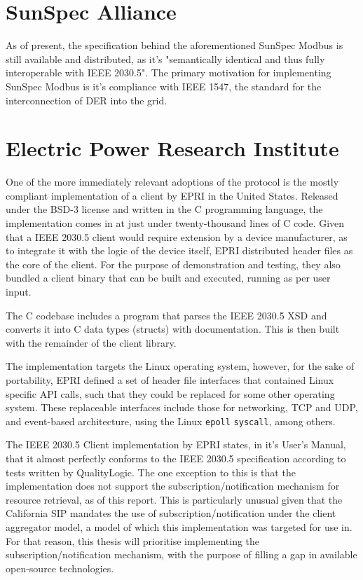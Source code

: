 \section{SunSpec Alliance}

As of present, the specification behind the aforementioned SunSpec Modbus is still available and distributed, as it's "semantically identical and thus fully interoperable with IEEE 2030.5". 
The primary motivation for implementing SunSpec Modbus is it's compliance with IEEE 1547, the standard for the interconnection of DER into the grid. \cite[]{SunSpecModbus}


\section{Electric Power Research Institute}
One of the more immediately relevant adoptions of the protocol is the mostly compliant implementation of a client by EPRI in the United States.
Released under the BSD-3 license and written in the C programming language, the implementation comes in at just under twenty-thousand lines of C code.
Given that a IEEE 2030.5 client would require extension by a device manufacturer, as to integrate it with the logic of the device itself, EPRI distributed header files as the core of the client.
For the purpose of demonstration and testing, they also bundled a client binary that can be built and executed, running as per user input.

The C codebase includes a program that parses the IEEE 2030.5 XSD and converts it into C data types (structs) with documentation. This is then built with the remainder of the client library.

The implementation targets the Linux operating system, however, for the sake of portability, EPRI defined a set of header file interfaces that contained Linux specific API calls, such that they could be replaced for some other operating system.
These replaceable interfaces include those for networking, TCP and UDP, and event-based architecture, using the Linux \texttt{epoll} \texttt{syscall}, among others.

The IEEE 2030.5 Client implementation by EPRI states, in it's User's Manual, that it almost perfectly conforms to the IEEE 2030.5 specification according to tests written by QualityLogic.
The one exception to this is that the implementation does not support the subscription/notification mechanism for resource retrieval, as of this report.
This is particularly unusual given that the California SIP mandates the use of subscription/notification under the client aggregator model, a model of which this implementation was targeted for use in.
For that reason, this thesis will prioritise implementing the subscription/notification mechanism, with the purpose of filling a gap in available open-source technologies.
\cite[]{eprimanual}





